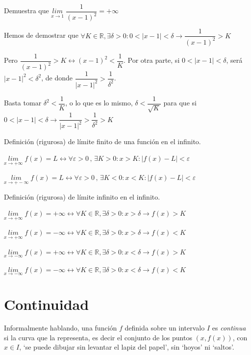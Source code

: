 	\begin{ejem} Demuestra que $\underset {x\to 1}{lim}\;{\dfrac {1}{(x-1)^2}}=+\infty$
	
	Hemos de demostrar que $\forall K \in \mathbb R , \exists \delta>0: 0<|x-1|<\delta \to \dfrac {1}{(x-1)^2}>K$
	
	Pero $\dfrac {1}{(x-1)^2}>K \leftrightarrow (x-1)^2 < \dfrac 1 K$. Por otra parte, si $0<|x-1|<\delta$, será $|x-1|^2<\delta^2$, de donde $\dfrac {1}{|x-1|^2}>\dfrac {1}{\delta^2}$.
	
	Basta tomar $\delta^2<\dfrac 1 K$, o lo que es lo mismo, $\delta < \dfrac {1}{\sqrt{K}}$ para que si $0<|x-1|<\delta \to \dfrac {1}{|x-1|^2}>\dfrac 1 {\delta^2} > K $
	
	
	\end{ejem}

	
	\begin{defi} Definición (rigurosa) de límite finito de una función en el infinito.
	
	 $\underset {x\to +\infty}{lim}\; {f(x)}=L \leftrightarrow \forall \varepsilon>0 \, , \, \exists K>0: x>K: |f(x)-L|<\varepsilon$
	
	 $\underset {x\to +
	-\infty}{lim}\; {f(x)}=L \leftrightarrow \forall \varepsilon>0 \, , \, \exists  K<0: x<K: |f(x)-L|<\varepsilon$
	\end{defi}
	
	\begin{defi}Definición (rigurosa) de límite infinito en el infinito.
	
	$\underset {x\to +\infty}{lim}\;{f(x)}=+\infty \leftrightarrow \forall K\in \mathbb R, \exists \delta>0: x>\delta \to f(x)>K $
	
	$\underset {x\to +\infty}{lim}\;{f(x)}=-\infty \leftrightarrow \forall K\in \mathbb R, \exists \delta>0: x>\delta \to f(x)<K $
	
	$\underset {x\to -\infty}{lim}\;{f(x)}=+\infty \leftrightarrow \forall K\in \mathbb R, \exists \delta>0: x<\delta \to f(x)>K $
	
	$\underset {x\to -\infty}{lim}\;{f(x)}=-\infty \leftrightarrow \forall K\in \mathbb R, \exists \delta>0: x<\delta \to f(x)<K $
		
	\end{defi}
	
	\section{Continuidad}
	
	Informalmente hablando, una función $f$ definida sobre un intervalo $I$ es \emph{continua} si la curva que la representa, es decir el conjunto de los puntos $(x, f(x))$, con $x \in I$, `se puede dibujar sin levantar el lapiz del papel', sin `hoyos' ni `saltos'.
	
